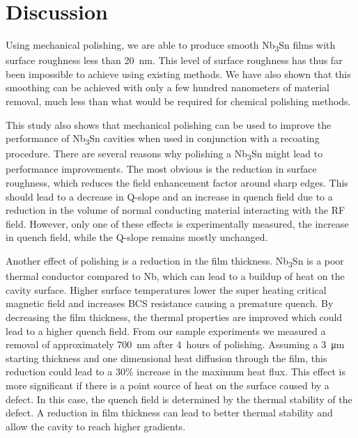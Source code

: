 \documentclass[reprint,amsmath,amssymb,aps]{revtex4-2}%
\begin{document}
%
\section{Discussion}%
\label{sec:Discussion}%
Using mechanical polishing, we are able to produce smooth Nb\textsubscript{3}Sn films with surface roughness less than 20~nm. This level of surface roughness has thus far been impossible to achieve using existing methods.\cite{posen2021advances,pudasaini2018studies,pudasaini2017post,hu2019reducing} We have also shown that this smoothing can be achieved with only a few hundred nanometers of material removal, much less than what would be required for chemical polishing methods.

This study also shows that mechanical polishing can be used to improve the performance of Nb\textsubscript{3}Sn cavities when used in conjunction with a recoating procedure. There are several reasons why polishing a Nb\textsubscript{3}Sn might lead to performance improvements. The most obvious is the reduction in surface roughness, which reduces the field enhancement factor around sharp edges. This should lead to a decrease in Q-slope and an increase in quench field\cite{knobloch1999high, xu2016simulation} due to a reduction in the volume of normal conducting material interacting with the RF field. However, only one of these effects is experimentally measured, the increase in quench field, while the Q-slope remains mostly unchanged.

Another effect of polishing is a reduction in the film thickness. Nb\textsubscript{3}Sn is a poor thermal conductor compared to Nb, which can lead to a buildup of heat on the cavity surface. Higher surface temperatures lower the super heating critical magnetic field and increases BCS resistance causing a premature quench. By decreasing the film thickness, the thermal properties are improved which could lead to a higher quench field\cite{kulyavtsev2021simulations}. From our sample experiments we measured a removal of approximately 700~nm after 4~hours of polishing. Assuming a 3~\unit{\micro\metre} starting thickness and one dimensional heat diffusion through the film, this reduction could lead to a 30\% increase in the maximum heat flux. This effect is more significant if there is a point source of heat on the surface caused by a defect\cite{porter2021advancing}. In this case, the quench field is determined by the thermal stability of the defect. A reduction in film thickness can lead to better thermal stability and allow the cavity to reach higher gradients.
\end{document}
